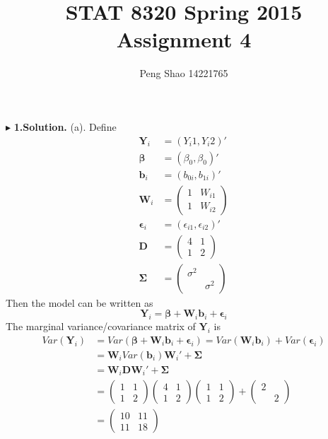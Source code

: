 \documentclass[letterpaper, 12pt]{article}
\newcommand{\ba}{$$\begin{aligned}}
\newcommand{\ea}{\end{aligned}$$}
\begin{document}
\title{STAT 8320 Spring 2015 Assignment 4}
\author{Peng Shao 14221765}
\maketitle
\indent




$\blacktriangleright$ \textbf{1.\quad Solution.} 
(a). Define
\ba
\bm{Y}_i&=(Y_i1,Y_i2)'\\
\bm{\beta}&=(\beta_0,\beta_0)'\\
\bm{b}_i&=(b_{0i},b_{1i})'\\
\bm{W}_i&=\left(\begin{matrix}
1&W_{i1}\\
1&W_{i2}
\end{matrix}\right)\\
\bm{\epsilon}_i&=(\epsilon_{i1},\epsilon_{i2})'\\
\bm{D}&=\left(\begin{matrix}
4 &1\\
1 &2
\end{matrix}\right)\\
\bm{\Sigma}&=\left(\begin{matrix}
\sigma^2\\
&\sigma^2
\end{matrix}\right)
\ea
Then the model can be written as
$$
\bm{Y}_i=\bm{\beta}+\bm{W}_i\bm{b}_i+\bm{\epsilon}_i
$$
The marginal variance/covariance matrix of $\bm{Y}_i$ is 
\ba
Var(\bm{Y}_i)&=Var(\bm{\beta}+\bm{W}_i\bm{b}_i+\bm{\epsilon}_i)=Var(\bm{W}_i\bm{b}_i)+Var(\bm{\epsilon}_i)\\
&=\bm{W}_iVar(\bm{b}_i)\bm{W}_i'+\bm{\Sigma}\\
&=\bm{W}_i\bm{D}\bm{W}_i'+\bm{\Sigma}\\
&=\left(\begin{matrix}
1&1\\
1&2
\end{matrix}\right)\left(\begin{matrix}
4&1\\
1&2
\end{matrix}\right)\left(\begin{matrix}
1&1\\
1&2
\end{matrix}\right)+\left(\begin{matrix}
2\\
&2
\end{matrix}\right)\\
&=\left(\begin{matrix}
10&11\\
11&18
\end{matrix}\right)
\ea
\end{document}
